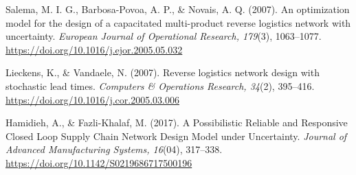 \begin{thebibliography}{99}
Salema, M. I. G., Barbosa-Povoa, A. P., \& Novais, A. Q. (2007). An optimization model for the design of a capacitated multi-product reverse logistics network with uncertainty. \textit{European Journal of Operational Research, 179}(3), 1063--1077. \href{https://doi.org/10.1016/j.ejor.2005.05.032}{https://doi.org/10.1016/j.ejor.2005.05.032}

Lieckens, K., \& Vandaele, N. (2007). Reverse logistics network design with stochastic lead times. \textit{Computers \& Operations Research, 34}(2), 395--416. \href{https://doi.org/10.1016/j.cor.2005.03.006}{https://doi.org/10.1016/j.cor.2005.03.006}

Hamidieh, A., \& Fazli-Khalaf, M. (2017). A Possibilistic Reliable and Responsive Closed Loop Supply Chain Network Design Model under Uncertainty. \textit{Journal of Advanced Manufacturing Systems, 16}(04), 317--338. \href{https://doi.org/10.1142/S0219686717500196}{https://doi.org/10.1142/S0219686717500196}

\end{thebibliography}